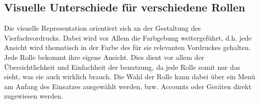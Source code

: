 \subsection{Visuelle Unterschiede für verschiedene Rollen}
Die visuelle Representation orientiert sich an der Gestaltung des Vierfachvordrucks. Dabei wird vor Allem die Farbgebung weitergeführt,   
d.h. jede Ansicht wird thematisch in der Farbe des für sie relevanten Vordruckes gehalten. Jede Rolle bekommt ihre eigene Ansicht.  
Dies dient vor allem der Übersichtlichkeit und Einfachheit der benutzung, da jede Rolle somit nur das sieht, was sie auch wirklich brauch.  
Die Wahl der Rolle kann dabei über ein Menü am Anfang des Einsatzes ausgewählt werden, bzw. Accounts oder Geräten direkt zugewiesen werden.  
